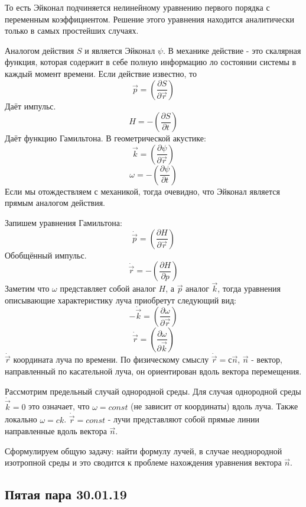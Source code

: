 \documentclass[14pt,a4paper,oneside]{extarticle}	%
\newcommand{\bracket}[1] {\left( #1 \right) } %
\newcommand{\dif}[2] {\bracket{ \frac{\partial #1}{\partial #2} }}
\begin{document}
То есть Эйконал подчиняется нелинейному уравнению первого порядка с переменным коэффициентом.
Решение этого уравнения находится аналитически только в самых простейших случаях.

Аналогом действия  $ S $ и является Эйконал $ \psi $.
В механике действие - это скалярная функция, которая содержит в себе полную информацию ло состоянии системы в каждый момент времени. Если действие известно, то 
\begin{equation*}
\vec{p} = \dif{S}{\vec{r}}
\end{equation*}
Даёт импульс. 
\begin{equation*}
H = -\dif{S}{t}
\end{equation*}
Даёт функцию Гамильтона.
В геометрической акустике:
\begin{equation*}
\vec{k} = \dif{\psi}{\vec{r}}
\end{equation*}
\begin{equation*}
\omega = -\dif{\psi}{t}
\end{equation*}
Если мы отождествляем с механикой, тогда очевидно, что Эйконал является прямым аналогом действия.

Запишем уравнения Гамильтона:
\begin{equation*}
\dot{\vec{p}} = \dif{H}{\vec{r}}
\end{equation*}
Обобщённый импульс.
\begin{equation*}
\dot{\vec{r}} = -\dif{H}{p}
\end{equation*}
Заметим что $ \omega $ представляет собой аналог $ H $, а $ \vec{p} $ аналог $ \vec{k} $, тогда уравнения описывающие характеристику луча приобретут следующий вид:
\begin{equation*}
-\dot{\vec{k}} = \dif{\omega}{\vec{r}}
\end{equation*}
\begin{equation*}
\dot{\vec{r}} = \dif{\omega}{\vec{k}}
\end{equation*}
$ \dot{\vec{r}} $ координата луча по времени. По физическому смыслу $ \dot{\vec{r}} = с\vec{n} $, $ \vec{n} $ - вектор, направленный по касательной луча, он ориентирован вдоль вектора перемещения.


Рассмотрим предельный случай однородной среды.
Для случая однородной среды $ \dot{\vec{k}}  = 0 $ это означает, что $ \omega = const $ (не зависит от координаты) вдоль луча. Также локально $ \omega = ck $. $ \dot{\vec{r}} = const $ - лучи представляют собой прямые линии направленные вдоль вектора $ \vec{n} $.

Сформулируем общую задачу: найти формулу лучей, в случае неоднородной изотропной среды и это сводится к проблеме нахождения уравнения вектора $ \vec{n} $.
\newpage
\begin{center}
	\section*{Пятая пара 30.01.19} %
\end{center}
\end{document}
